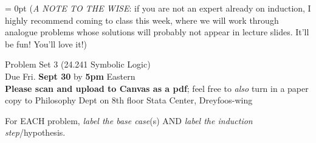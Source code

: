 \documentclass[12pt]{article}
\begin{document}

%
\newcommand{\detritus}[1]{}


\thispagestyle{empty}
\parindent = 0pt
(\textit{A NOTE TO THE WISE}: if you are not an expert already on induction, I highly recommend coming to class this week, where we will work through analogue problems whose solutions will probably not appear in lecture slides. It'll be fun! You'll love it!)

\iffalse
\hspace*{0.0in}\parbox[t]{2.5in}{
Philosophy 24.241\\[3pt]
Symbolic Logic \\[3pt]
Fall, 2022
}
\fi 

%

\bigskip %


\begin{center}
\Large Problem Set 3 \large{(24.241 Symbolic Logic)}\\[1ex] 
 Due Fri. \textbf{Sept 30} by \textbf{5pm} Eastern\\ \normalsize{\textbf{Please scan and upload to Canvas as a pdf}; feel free to \textit{also} turn in a paper copy to Philosophy Dept on 8th floor Stata Center, Dreyfoos-wing} \\[3ex] 
\end{center}



For EACH problem, \textit{label the base case}(s) AND \textit{label the induction step}/hypothesis. 
\end{document}
